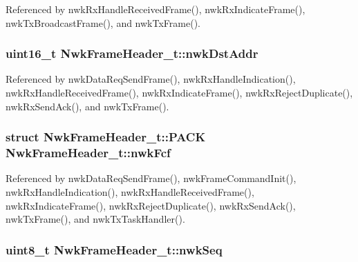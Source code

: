 Referenced by nwk\-Rx\-Handle\-Received\-Frame(), nwk\-Rx\-Indicate\-Frame(), nwk\-Tx\-Broadcast\-Frame(), and nwk\-Tx\-Frame().

\hypertarget{struct_nwk_frame_header__t_a73226e1cb8813883d7c5ce8e9bf7ef40}{
\subsubsection[{nwk\-Dst\-Addr}]{\setlength{\rightskip}{0pt plus 5cm}uint16\-\_\-t Nwk\-Frame\-Header\-\_\-t\-::nwk\-Dst\-Addr}}\label{struct_nwk_frame_header__t_a73226e1cb8813883d7c5ce8e9bf7ef40}


Referenced by nwk\-Data\-Req\-Send\-Frame(), nwk\-Rx\-Handle\-Indication(), nwk\-Rx\-Handle\-Received\-Frame(), nwk\-Rx\-Indicate\-Frame(), nwk\-Rx\-Reject\-Duplicate(), nwk\-Rx\-Send\-Ack(), and nwk\-Tx\-Frame().

\hypertarget{struct_nwk_frame_header__t_a0db7c5ebd8f56586b41063be79f69d5a}{
\subsubsection[{nwk\-Fcf}]{\setlength{\rightskip}{0pt plus 5cm}struct {\bf Nwk\-Frame\-Header\-\_\-t\-::\-P\-A\-C\-K}            Nwk\-Frame\-Header\-\_\-t\-::nwk\-Fcf}}\label{struct_nwk_frame_header__t_a0db7c5ebd8f56586b41063be79f69d5a}


Referenced by nwk\-Data\-Req\-Send\-Frame(), nwk\-Frame\-Command\-Init(), nwk\-Rx\-Handle\-Indication(), nwk\-Rx\-Handle\-Received\-Frame(), nwk\-Rx\-Indicate\-Frame(), nwk\-Rx\-Reject\-Duplicate(), nwk\-Rx\-Send\-Ack(), nwk\-Tx\-Frame(), and nwk\-Tx\-Task\-Handler().

\hypertarget{struct_nwk_frame_header__t_a198e5b4ebb92d3b58b38dfa6a1a836e4}{
\subsubsection[{nwk\-Seq}]{\setlength{\rightskip}{0pt plus 5cm}uint8\-\_\-t Nwk\-Frame\-Header\-\_\-t\-::nwk\-Seq}}\label{struct_nwk_frame_header__t_a198e5b4ebb92d3b58b38dfa6a1a836e4}


